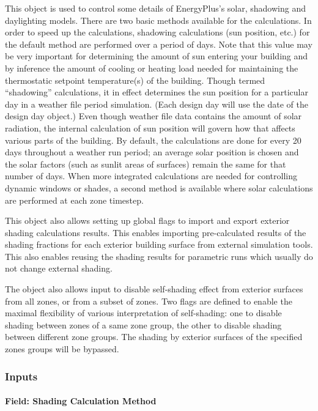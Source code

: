 This object is used to control some details of EnergyPlus's solar, shadowing and daylighting models. There are two basic methods available for the calculations. In order to speed up the calculations, shadowing calculations (sun position, etc.) for the default method are performed over a period of days. Note that this value may be very important for determining the amount of sun entering your building and by inference the amount of cooling or heating load needed for maintaining the thermostatic setpoint temperature(s) of the building. Though termed ``shadowing'' calculations, it in effect determines the sun position for a particular day in a weather file period simulation. (Each design day will use the date of the design day object.) Even though weather file data contains the amount of solar radiation, the internal calculation of sun position will govern how that affects various parts of the building. By default, the calculations are done for every 20 days throughout a weather run period; an average solar position is chosen and the solar factors (such as sunlit areas of surfaces) remain the same for that number of days. When more integrated calculations are needed for controlling dynamic windows or shades, a second method is available where solar calculations are performed at each zone timestep.

This object also allows setting up global flags to import and export exterior shading calculations results. This enables importing pre-calculated results of the shading fractions for each exterior building surface from external simulation tools. This also enables reusing the shading results for parametric runs which usually do not change external shading.

The object also allows input to disable self-shading effect from exterior surfaces from all zones, or from a subset of zones. Two flags are defined to enable the maximal flexibility of various interpretation of self-shading: one to disable shading between zones of a same zone group, the other to disable shading between different zone groups. The shading by exterior surfaces of the specified zones groups will be bypassed.

\subsubsection{Inputs}\label{inputs-10-019}

\paragraph{Field: Shading Calculation Method}\label{field-shading-calculation-method}

